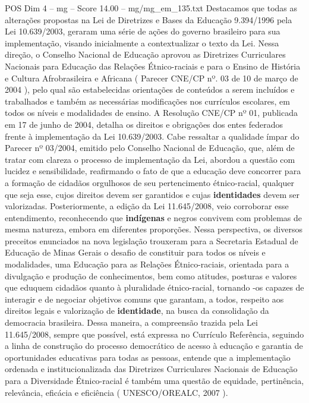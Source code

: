 \begin{textsample}{POS Dim 4 – mg – Score 14.00 – mg/mg\_em\_135.txt}
Destacamos que todas as alterações propostas na Lei de Diretrizes e Bases da Educação 9.394/1996 pela Lei 10.639/2003, geraram uma série de ações do governo brasileiro para sua implementação, visando inicialmente a contextualizar o texto da Lei.
Nessa direção, o Conselho Nacional de Educação aprovou as Diretrizes Curriculares Nacionais para Educação das Relações Étnico-raciais e para o Ensino de História e Cultura Afrobrasileira e Africana ( Parecer CNE/CP nº. 03 de 10 de março de 2004 ), pelo qual são estabelecidas orientações de conteúdos a serem incluídos e trabalhados e também as necessárias modificações nos currículos escolares, em todos os níveis e modalidades de ensino.
A Resolução CNE/CP nº 01, publicada em 17 de junho de 2004, detalha os direitos e obrigações dos entes federados frente à implementação da Lei 10.639/2003.
Cabe ressaltar a qualidade ímpar do Parecer nº 03/2004, emitido pelo Conselho Nacional de Educação, que, além de tratar com clareza o processo de implementação da Lei, abordou a questão com lucidez e sensibilidade, reafirmando o fato de que a educação deve concorrer para a formação de cidadãos orgulhosos de seu pertencimento étnico-racial, qualquer que seja esse, cujos direitos devem ser garantidos e cujas \textbf{identidades} devem ser valorizadas.
Posteriormente, a edição da Lei 11.645/2008, veio corroborar esse entendimento, reconhecendo que \textbf{indígenas} e negros convivem com problemas de mesma natureza, embora em diferentes proporções.
Nessa perspectiva, os diversos preceitos enunciados na nova legislação trouxeram para a Secretaria Estadual de Educação de Minas Gerais o desafio de constituir para todos os níveis e modalidades, uma Educação para as Relações Étnico-raciais, orientada para a divulgação e produção de conhecimentos, bem como atitudes, posturas e valores que eduquem cidadãos quanto à pluralidade étnico-racial, tornando -os capazes de interagir e de negociar objetivos comuns que garantam, a todos, respeito aos direitos legais e valorização de \textbf{identidade}, na busca da consolidação da democracia brasileira.
Dessa maneira, a compreensão trazida pela Lei 11.645/2008, sempre que possível, está expressa no Currículo Referência, seguindo a linha de construção do processo democrático de acesso à educação e garantia de oportunidades educativas para todas as pessoas, entende que a implementação ordenada e institucionalizada das Diretrizes Curriculares Nacionais de Educação para a Diversidade Étnico-racial é também uma questão de equidade, pertinência, relevância, eficácia e eficiência ( UNESCO/OREALC, 2007 ).

\end{textsample}

